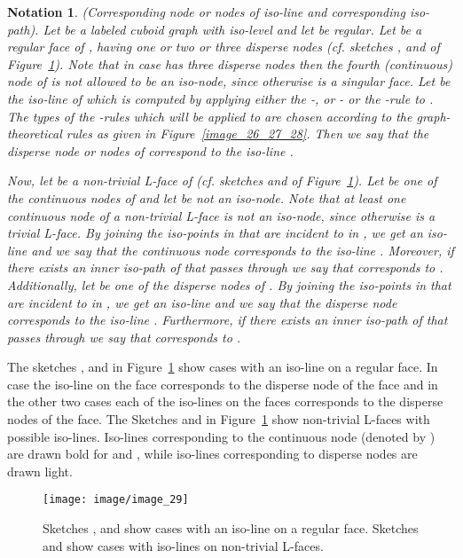 \documentclass[a4paper,11pt]{article}
\newtheorem{notation}{Notation}
\begin{document}
\begin{notation}(Corresponding node or nodes of iso-line and corresponding iso-path). Let 
be a labeled cuboid graph with iso-level  and let  be regular. Let 
be a regular face of , having one or two or three disperse nodes (cf. sketches ,  and  of
Figure~\ref{image_29}). Note that in case  has three disperse nodes then the fourth (continuous) node
of  is not allowed to be an iso-node, since otherwise  is a singular face.
Let  be the iso-line of  which is computed by applying either the -, or - or the
-rule to . The types of the -rules which will be applied to  are chosen according to
the graph-theoretical rules as given in Figure~\ref{image_26_27_28}. Then we say that the disperse
node or nodes of  correspond to the iso-line .

Now, let  be a non-trivial L-face of  (cf. sketches  and  of
Figure~\ref{image_29}). Let  be one of the continuous nodes of  and let  be not an iso-node.
Note that at least one continuous node of a non-trivial L-face is not an iso-node, since otherwise  is a
trivial L-face. By joining the iso-points in  that are incident to  in , we get an iso-line  and we
say that the continuous node  corresponds to the iso-line . Moreover, if there exists an inner
iso-path  of  that passes through  we say that  corresponds to . Additionally, let 
be one of the disperse nodes of . By joining the iso-points in  that are incident to  in , we get
an iso-line  and we say that the disperse node  corresponds to the iso-line . Furthermore,
if there exists an inner iso-path  of  that passes through  we say that  corresponds to .
\label{note:corresponding-node}
\end{notation}
The sketches ,  and  in Figure~\ref{image_29} show cases with an iso-line on a regular face. In
case  the iso-line on the face corresponds to the disperse node of the face and in the other two cases
each of the iso-lines on the faces corresponds to the disperse nodes of the face. The Sketches  and
 in Figure~\ref{image_29} show non-trivial L-faces with possible iso-lines. Iso-lines corresponding to
the continuous node (denoted by ) are drawn bold for  and , while iso-lines
corresponding to disperse nodes are drawn light.
\begin{figure}[!ht]
\texttt{[image: image/image\_29]}
\caption{Sketches ,  and  show cases with an iso-line on a regular face.
Sketches  and  show cases with iso-lines on non-trivial L-faces.}
\label{image_29}
\end{figure}
\FloatBarrier
\end{document}
